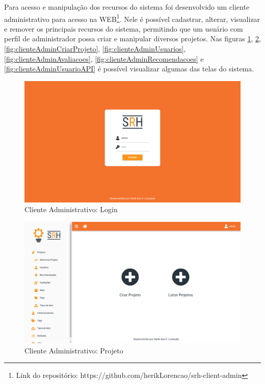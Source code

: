 Para acesso e manipulação dos recursos do sistema foi desenvolvido um cliente administrativo para acesso na WEB\footnote{Link do repositório: https://github.com/herikLorencao/srh-client-admin}. Nele é possível cadastrar, alterar, visualizar e remover os principais recursos do sistema, permitindo que um usuário com perfil de administrador possa criar e manipular diversos projetos. Nas figuras \ref{fig:clienteAdminLogin}, \ref{fig:clienteAdminProjeto}, \ref{fig:clienteAdminCriarProjeto}, \ref{fig:clienteAdminUsuarios}, \ref{fig:clienteAdminAvaliacoes}, \ref{fig:clienteAdminRecomendacoes} e \ref{fig:clienteAdminUsuarioAPI} é possível visualizar algumas das telas do sistema.

\begin{figure}[H]
	\centering
	\includegraphics[width=.9\linewidth]{imagens/adminLogin.png}
	\caption[Cliente Administrativo: Login]{Cliente Administrativo: Login}
    \label{fig:clienteAdminLogin}
\end{figure}

\begin{figure}[H]
	\centering
	\includegraphics[width=.9\linewidth]{imagens/adminCriarProjeto.png}
	\caption[Cliente Administrativo: Projeto]{Cliente Administrativo: Projeto}
    \label{fig:clienteAdminProjeto}
\end{figure}

